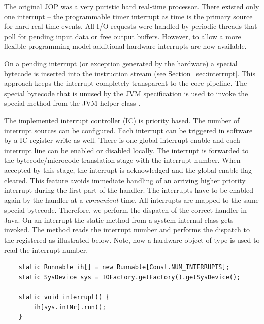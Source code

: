 
The original JOP \cite{jop:thesis,jop:jnl:jsa2007} was a very
puristic hard real-time processor. There existed only one interrupt
-- the programmable timer interrupt as time is the primary source for
hard real-time events. All I/O requests were handled by periodic
threads that poll for pending input data or free output buffers.
However, to allow a more flexible programming model additional
hardware interrupts are now available.

On a pending interrupt (or exception generated by the hardware) a
special bytecode is inserted into the instruction stream (see
Section~\ref{sec:interrupt}. This approach keeps the interrupt
completely transparent to the core pipeline. The special bytecode
that is unused by the JVM specification \cite{jvm} is used to invoke
the special method  from the JVM helper class
.

The implemented interrupt controller (IC) is priority based. The
number of interrupt sources can be configured. Each interrupt can be
triggered in software by a IC register write as well. There is one
global interrupt enable and each interrupt line can be enabled or
disabled locally. The interrupt is forwarded to the
bytecode/microcode translation stage with the interrupt number. When
accepted by this stage, the interrupt is acknowledged and the global
enable flag cleared. This feature avoids immediate handling of an
arriving higher priority interrupt during the first part of the
handler. The interrupts have to be enabled again by the handler at a
\emph{convenient} time. All interrupts are mapped to the same special
bytecode. Therefore, we perform the dispatch of the correct handler
in Java. On an interrupt the static method  from a
system internal class gets invoked. The method reads the interrupt
number and performs the dispatch to the registered  as
illustrated below. Note, how a hardware object of type
 is used to read the interrupt number.


\begin{samepage}
\begin{lstlisting}
    static Runnable ih[] = new Runnable[Const.NUM_INTERRUPTS];
    static SysDevice sys = IOFactory.getFactory().getSysDevice();

    static void interrupt() {
        ih[sys.intNr].run();
    }
\end{lstlisting}
\end{samepage}


